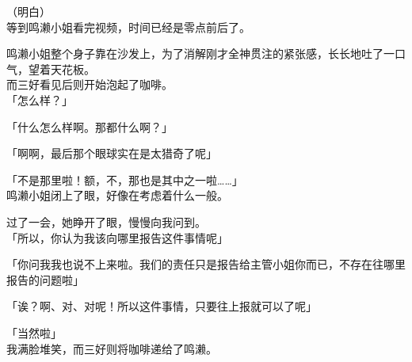 （明白）\\

等到鸣濑小姐看完视频，时间已经是零点前后了。

鸣濑小姐整个身子靠在沙发上，为了消解刚才全神贯注的紧张感，长长地吐了一口气，望着天花板。\\

而三好看见后则开始泡起了咖啡。\\

「怎么样？」

「什么怎么样啊。那都什么啊？」

「啊啊，最后那个眼球实在是太猎奇了呢」

「不是那里啦！额，不，那也是其中之一啦……」\\

鸣濑小姐闭上了眼，好像在考虑着什么一般。

过了一会，她睁开了眼，慢慢向我问到。\\

「所以，你认为我该向哪里报告这件事情呢」

「你问我我也说不上来啦。我们的责任只是报告给主管小姐你而已，不存在往哪里报告的问题啦」

「诶？啊、对、对呢！所以这件事情，只要往上报就可以了呢」

「当然啦」\\

我满脸堆笑，而三好则将咖啡递给了鸣濑。\\

